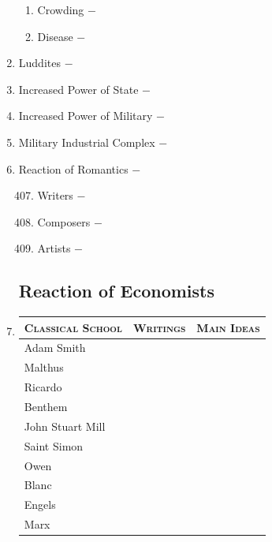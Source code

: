 \documentclass[12pt]{article}
\begin{document}
\begin{enumerate}
\begin{enumerate}[label=\arabic{*}.]
\item Crowding $-$

\item Disease $-$ 


\end{enumerate}
\setcounter{enumi}{401}

\item Luddites $-$ 

\item Increased Power of State $-$ 

\item Increased Power of Military $-$ 

\item Military Industrial Complex $-$ 

\item Reaction of Romantics $-$ 

\begin{enumerate}[label=\arabic{*}.]
\setcounter{enumii}{406}

\item Writers $-$ 

\item Composers $-$ 

\item Artists $-$  


\end{enumerate}
\setcounter{enumi}{409}

\subsection{Reaction of Economists}

\item \begin{tabular}{l c c}
\textsc{Classical School} & \textsc{Writings} & \textsc{Main Ideas} \\
\hline
Adam Smith & & \\
\hline
Malthus & & \\
\hline 
Ricardo & & \\
\hline
Benthem & & \\
\hline
John Stuart Mill & & \\
\hline
Saint Simon & & \\
\hline
Owen & & \\
\hline
Blanc & & \\
\hline
Engels & & \\
\hline
Marx & & \\
\end{tabular}


\end{enumerate}
\end{document}
